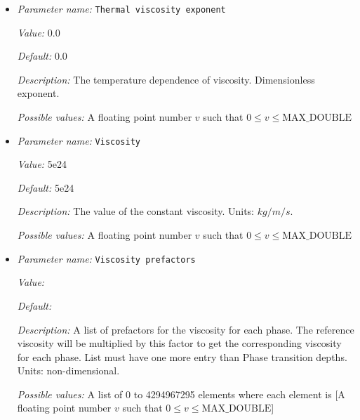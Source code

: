 \begin{itemize}
{\it Value:} 4e-5


{\it Default:} 4e-5


{\it Description:} The value of the thermal expansion coefficient $\beta$. Units: $1/K$.


{\it Possible values:} A floating point number $v$ such that $0 \leq v \leq \text{MAX\_DOUBLE}$
\item {\it Parameter name:} {\tt Thermal viscosity exponent}
\label{parameters:Material model/Latent heat/Thermal viscosity exponent}


{\it Value:} 0.0


{\it Default:} 0.0


{\it Description:} The temperature dependence of viscosity. Dimensionless exponent.


{\it Possible values:} A floating point number $v$ such that $0 \leq v \leq \text{MAX\_DOUBLE}$
\item {\it Parameter name:} {\tt Viscosity}
\label{parameters:Material model/Latent heat/Viscosity}


{\it Value:} 5e24


{\it Default:} 5e24


{\it Description:} The value of the constant viscosity. Units: $kg/m/s$.


{\it Possible values:} A floating point number $v$ such that $0 \leq v \leq \text{MAX\_DOUBLE}$
\item {\it Parameter name:} {\tt Viscosity prefactors}
\label{parameters:Material model/Latent heat/Viscosity prefactors}


{\it Value:} 


{\it Default:} 


{\it Description:} A list of prefactors for the viscosity for each phase. The reference viscosity will be multiplied by this factor to get the corresponding viscosity for each phase. List must have one more entry than Phase transition depths. Units: non-dimensional.


{\it Possible values:} A list of 0 to 4294967295 elements where each element is [A floating point number $v$ such that $0 \leq v \leq \text{MAX\_DOUBLE}$]
\end{itemize}

